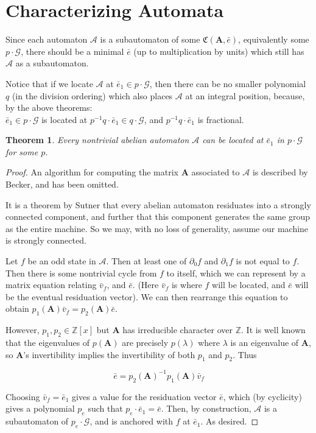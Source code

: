 \documentclass[12pt]{article}
\newcommand{\A}{\mathcal{A}}
\newcommand{\G}{\mathcal{G}}
\newcommand{\C}{\mathfrak{C}(\Am,\e)}
\newcommand{\Z}{\mathbb{Z}}
\newcommand{\2}{\textbf{2}}
\newcommand{\Am}{\textbf{A}}
\newcommand{\del}{\partial}
\renewcommand{\v}{\bar{v}}
\newcommand{\e}{\bar{e}}
\newtheorem{thm}{Theorem}
\begin{document}
\section{Characterizing Automata}
Since each automaton $\A$ is a subautomaton of some $\C$,
equivalently some $p \cdot \G$, there should be a minimal $\e$ 
(up to multiplication by units) which still has $\A$ as a subautomaton. 

Notice that if we locate $\A$ at $\e_1 \in p \cdot \G$, 
then there can be no smaller polynomial $q$ (in the division ordering)
which also places $\A$ at an integral position, because, by the above
theorems:\\ 
$\e_1 \in p \cdot \G$ is located at $p^{-1}q \cdot \e_1 \in q \cdot \G$, 
and $p^{-1}q \cdot \e_1$ is fractional.


\begin{thm}
  Every nontrivial abelian automaton $\A$ can be 
  located at $\e_1$ in $p \cdot \G$ for some $p$.
\end{thm}

\begin{proof}
  An algorithm for computing the matrix $\Am$ associated to $\A$ is
  described by Becker, and has been omitted.

  It is a theorem by Sutner \cite{Sutner18:abelian_automata} that every 
  abelian automaton residuates into a strongly connected component, 
  and further that this component generates the same group as the entire 
  machine. So we may, with no loss of generality, assume our machine is 
  strongly connected.

  Let $f$ be an odd state in $\A$. Then at least one of $\del_0 f$ and 
  $\del_1 f$ is not equal to $f$. Then there is some nontrivial cycle
  from $f$ to itself, which we can represent by a matrix equation 
  relating $\v_f$, and $\e$. (Here $\v_f$ is where $f$ will be located, 
  and $\e$ will be the eventual residuation vector). 
  We can then rearrange this equation to obtain 
  $p_1(\Am)\v_f = p_2(\Am)\e$.

  However, $p_1, p_2 \in \Z[x]$ but $\Am$ has irreducible character over $\Z$.
  It is well known that the eigenvalues of $p(\Am)$ are precisely $p(\lambda)$
  where $\lambda$ is an eigenvalue of $\Am$, so $\Am$'s invertibility implies
  the invertibility of both $p_1$ and $p_2$. Thus

  \[ \e = p_2(\Am)^{-1}p_1(\Am)\v_f \]

  Choosing $\v_f = \e_1$ gives a value for the residuation vector $\e$,
  which (by cyclicity) gives a polynomial $p_e$ 
  such that $p_e \cdot \e_1 = \e$. Then, by construction, $\A$ is 
  a subautomaton of $p_e \cdot \G$, and is anchored with $f$ at $\e_1$.
  As desired.
\end{proof}
\end{document}
